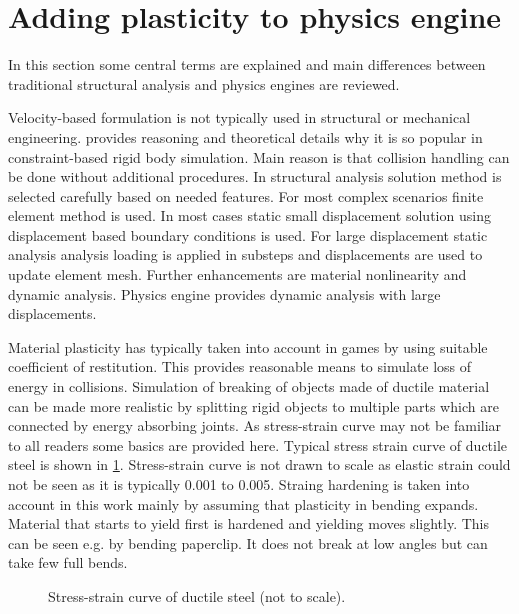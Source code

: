 \section{Adding plasticity to physics engine}

In this section some central terms are explained and main differences between traditional structural 
analysis and physics engines are reviewed.

Velocity-based formulation is not typically used in structural or mechanical engineering.
 \citet[p.~45]{erleben.thesis} provides reasoning and theoretical details why it is so popular in 
constraint-based rigid body simulation. 
Main reason is that collision handling can be done without additional procedures.
In structural analysis solution method is selected carefully based on needed features.
For most complex scenarios finite element method is used.
In most cases static small displacement solution using displacement based boundary conditions is used.
For large displacement static analysis analysis loading is applied in substeps and 
displacements are used to update element mesh.
Further enhancements are material nonlinearity and dynamic analysis.
Physics engine provides dynamic analysis with large displacements.

Material plasticity has typically taken into account in games by using suitable coefficient of restitution.
This provides reasonable means to simulate loss of energy in collisions.
Simulation of breaking of objects made of ductile material can be made more realistic by splitting rigid objects
to multiple parts which are connected by energy absorbing joints.
As stress-strain curve may not be familiar to all readers some basics are provided here.
Typical stress strain curve of ductile steel is shown in \ref{fig:areas}.
Stress-strain curve is not drawn to scale as elastic strain could not be seen as it is typically 0.001 to 0.005.
Straing hardening is taken into account in this work mainly by assuming that plasticity in bending expands.
Material that starts to yield first is hardened and yielding moves slightly.
This can be seen e.g. by bending paperclip. It does not break at low angles but can take few full bends. 

\begin{figure}[htb!]
\centering
{}
\caption{Stress-strain curve of ductile steel (not to scale).}
\label{fig:areas}
\end{figure}

